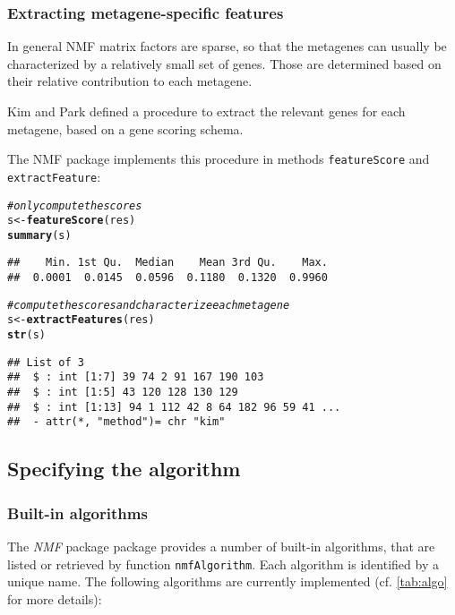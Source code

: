 \documentclass[a4paper]{article}\usepackage[]{graphicx}\usepackage[]{color}
\makeatletter
\newcommand{\hlcom}[1]{\textcolor[rgb]{0.678,0.584,0.686}{\textit{#1}}}%
\newcommand{\hlstd}[1]{\textcolor[rgb]{0.345,0.345,0.345}{#1}}%
\newcommand{\hlkwb}[1]{\textcolor[rgb]{0.69,0.353,0.396}{#1}}%
\newcommand{\hlkwd}[1]{\textcolor[rgb]{0.737,0.353,0.396}{\textbf{#1}}}%
\newenvironment{kframe}{%
 \def\at@end@of@kframe{}%
 \ifinner\ifhmode%
  \def\at@end@of@kframe{\end{minipage}}%
  \begin{minipage}{\columnwidth}%
 \fi\fi%
 \def\FrameCommand##1{\hskip\@totalleftmargin \hskip-\fboxsep
 \colorbox{shadecolor}{##1}\hskip-\fboxsep
     \hskip-\linewidth \hskip-\@totalleftmargin \hskip\columnwidth}%
 \MakeFramed {\advance\hsize-\width
   \@totalleftmargin\z@ \linewidth\hsize
   \@setminipage}}%
 {\par\unskip\endMakeFramed%
 \at@end@of@kframe}
\newenvironment{knitrout}{}{} %
\let\code=\texttt
\newcommand{\pkgname}[1]{\textit{#1}\xspace}
\newcommand{\Rpkg}[1]{\pkgname{#1} package\xspace}
\newcommand{\nmfpack}{\Rpkg{NMF}}
\renewcommand{\cite}[1]{\parencite{#1}}
\makeatother
\begin{document}
\subsubsection{Extracting metagene-specific features}

In general NMF matrix factors are sparse, so that the metagenes can usually be characterized by a relatively small set of genes. Those are determined based on 
their relative contribution to each metagene.

Kim and Park \cite{KimH2007} defined a procedure to extract the relevant genes for each metagene, based on a gene scoring schema.

The NMF package implements this procedure in methods \code{featureScore} and \code{extractFeature}:

\begin{knitrout}
\color{fgcolor}\begin{kframe}
\begin{alltt}
\hlcom{# only compute the scores}
\hlstd{s} \hlkwb{<-} \hlkwd{featureScore}\hlstd{(res)}
\hlkwd{summary}\hlstd{(s)}
\end{alltt}
\begin{verbatim}
##    Min. 1st Qu.  Median    Mean 3rd Qu.    Max. 
##  0.0001  0.0145  0.0596  0.1180  0.1320  0.9960
\end{verbatim}
\begin{alltt}
\hlcom{# compute the scores and characterize each metagene}
\hlstd{s} \hlkwb{<-} \hlkwd{extractFeatures}\hlstd{(res)}
\hlkwd{str}\hlstd{(s)}
\end{alltt}
\begin{verbatim}
## List of 3
##  $ : int [1:7] 39 74 2 91 167 190 103
##  $ : int [1:5] 43 120 128 130 129
##  $ : int [1:13] 94 1 112 42 8 64 182 96 59 41 ...
##  - attr(*, "method")= chr "kim"
\end{verbatim}
\end{kframe}
\end{knitrout}


\subsection{Specifying the algorithm}\label{sec:algo}

\subsubsection{Built-in algorithms}
The \nmfpack package provides a number of built-in algorithms, that are listed or retrieved by function \code{nmfAlgorithm}. 
Each algorithm is identified by a unique name.
The following algorithms are currently implemented (cf. \cref{tab:algo} for more details):
\end{document}
